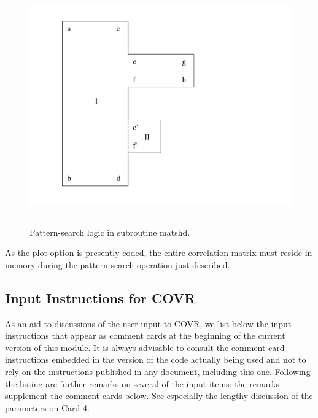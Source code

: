 \begin{figure}[htb]\centering
\includegraphics[keepaspectratio, height=4.0in, angle=0]{figs/covr1ack}
\caption[Pattern-search logic in used in COVR's subroutine
 matshd]{Pattern-search logic in subroutine matshd.}
\label{shade}
\end{figure}

As the plot option is presently coded, the entire correlation matrix
must reside in memory during the pattern-search operation just
described.

\subsection{Input Instructions for COVR}
\label{ssCOVR_inp}

As an aid to discussions of the user input to COVR, we list below the
input instructions that appear as comment cards at the beginning of the
current version of this module.  It is always advisable to consult the
comment-card instructions embedded in the version of the code actually
being used and not to rely on the instructions published in any
document, including this one.  Following the listing are further
remarks on several of the input items; the remarks supplement the
comment cards below.  See especially the lengthy discussion of the
parameters on Card 4.

